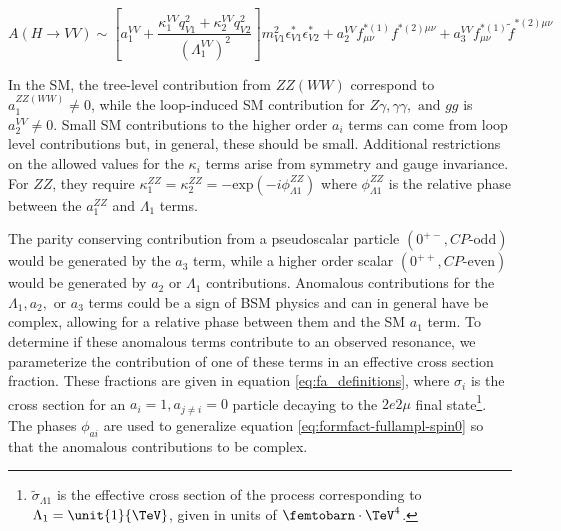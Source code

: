 \begingroup
\small
\begin{equation}
A(H\to VV) \sim
\left[ a_{1}^{VV}
+ \frac{\kappa_1^{VV}q_{V1}^2 + \kappa_2^{VV} q_{V2}^{2}}{\left(\Lambda_{1}^{VV} \right)^{2}} \right]
m_{V1}^2 \epsilon_{V1}^* \epsilon_{V2}^*
+ a_{2}^{VV}  f_{\mu \nu}^{*(1)}f^{*(2)\mu\nu}
+ a_{3}^{VV}   f^{*(1)}_{\mu \nu} {\tilde f}^{*(2)\mu\nu}
\label{eq:formfact-fullampl-spin0}
\end{equation}
\endgroup

In the SM, the tree-level contribution from $ZZ \left(WW\right)$ correspond to $a_{1}^{ZZ \left(WW\right)} \neq 0$, while the loop-induced SM contribution for $Z\gamma, \gamma\gamma, \text{ and } gg$ is $a_{2}^{VV} \neq 0$. Small SM contributions to the higher order $a_{i}$ terms can come from loop level contributions but, in general, these should be small. Additional restrictions on the allowed values for the $\kappa_{i}$ terms arise from symmetry and gauge invariance. For $ZZ$, they require $\kappa_{1}^{ZZ} = \kappa_{2}^{ZZ} = - \text{exp}\left(-i\phi_{\Lambda1}^{ZZ}\right)$ where $\phi_{\Lambda1}^{ZZ}$ is the relative phase between the $a_{1}^{ZZ}$ and $\Lambda_{1}$ terms. 

The parity conserving contribution from a pseudoscalar particle $\left( 0^{+-}, CP\text{-odd} \right)$ would be generated by the $a_{3}$ term, while a higher order scalar $\left( 0^{++}, CP\text{-even} \right)$ would be generated by $a_{2}$ or $\Lambda_{1}$ contributions. Anomalous contributions for the $\Lambda_{1}, a_{2}, \text{ or } a_{3}$ terms could be a sign of BSM physics and can in general have be complex, allowing for a relative phase between them and the SM $a_{1}$ term. To determine if these anomalous terms contribute to an observed resonance, we parameterize the contribution of one of these terms in an effective cross section fraction. These fractions are given in equation \eqref{eq:fa_definitions}, where $\sigma_{i}$ is the cross section for an $a_{i} = 1, a_{j\neq i} = 0$ particle decaying to the $2e2\mu$ final state\footnote{$\tilde{\sigma}_{\Lambda{1}}$ is the effective cross section of the process corresponding to $\Lambda_{1} = \unit{1}{\TeV}$, given in units of $\femtobarn\cdot\TeV^{4}$.}. The phases $\phi_{ai}$ are used to generalize equation \eqref{eq:formfact-fullampl-spin0} so that the anomalous contributions to be complex.

